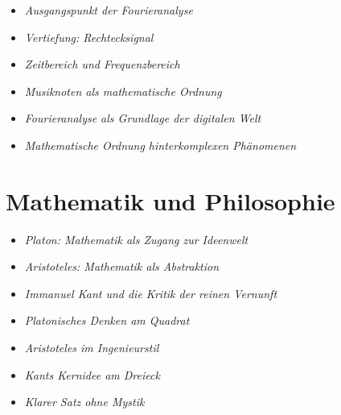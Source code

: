 \begin{NoteBox}[Hinweisboxen]
	\begin{itemize}
		\item \emph{Ausgangspunkt der Fourieranalyse}\dotfill \pageref{box:fourier-ausgangspunkt-waermeleitung}
		\item \emph{Vertiefung: Rechtecksignal}\dotfill \pageref{box:fourier-vertiefung-rechtecksignal}
		\item \emph{Zeitbereich und Frequenzbereich}\dotfill \pageref{box:fourier-zeitbereich-frequenzbereich}
		\item \emph{Musiknoten als mathematische Ordnung}\dotfill
		 \pageref{box:Musiknoten}
		\item \emph{Fourieranalyse als Grundlage der digitalen Welt}\dotfill \pageref{box:fourier-digitale-welt}
		\item \emph{Mathematische Ordnung hinter\newline komplexen Phänomenen}\dotfill \pageref{box:fourier-mathematische-ordnung}
	\end{itemize}
\end{NoteBox}


\section{Mathematik und Philosophie}

\begin{HistoryBox}
	
	\begin{itemize}
		\item \emph{Platon: Mathematik als Zugang zur Ideenwelt}\dotfill \pageref{box:platon-ideenwelt}
		\item \emph{Aristoteles: Mathematik als Abstraktion}\dotfill \pageref{box:aristoteles-abstraktion}
		\item \emph{Immanuel Kant und  die \glqq Kritik der \newline reinen Vernunft\grqq}\dotfill \pageref{box:kant-krv}
	\end{itemize}
\end{HistoryBox}

\begin{DidacticBox}[Didaktikboxen]
	\begin{itemize}
		\item \emph{Platonisches Denken am Quadrat}\dotfill \pageref{box:platon-quadrat}
		\item \emph{Aristoteles im Ingenieurstil}\dotfill \pageref{box:aristoteles-ingenieur}
		\item \emph{Kants Kernidee am Dreieck}\dotfill \pageref{box:kant-dreieck}
		\item \emph{Klarer Satz ohne Mystik}\dotfill \pageref{box:ohne-mystik}
	\end{itemize}
\end{DidacticBox}

